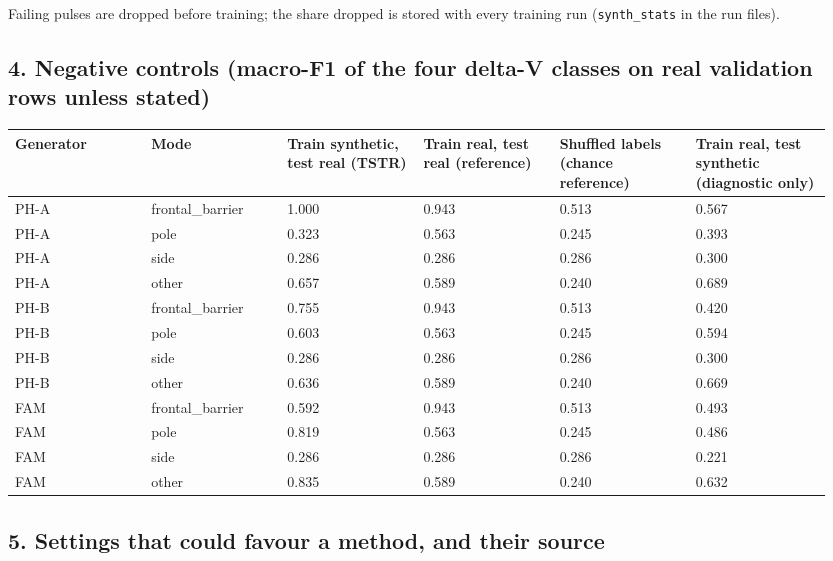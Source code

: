 Failing pulses are dropped before training; the share dropped is stored with every training run (\texttt{synth\_stats} in the run files).

\subsection*{4. Negative controls (macro-F1 of the four delta-V classes on real validation rows unless stated)}

{\scriptsize\raggedright
\begin{longtable}{p{0.158\linewidth}p{0.158\linewidth}p{0.158\linewidth}p{0.158\linewidth}p{0.158\linewidth}p{0.158\linewidth}}
\toprule
Generator & Mode & Train synthetic, test real (TSTR) & Train real, test real (reference) & Shuffled labels (chance reference) & Train real, test synthetic (diagnostic only) \\
\midrule
\endhead
PH-A & frontal\_barrier & 1.000 & 0.943 & 0.513 & 0.567 \\
PH-A & pole & 0.323 & 0.563 & 0.245 & 0.393 \\
PH-A & side & 0.286 & 0.286 & 0.286 & 0.300 \\
PH-A & other & 0.657 & 0.589 & 0.240 & 0.689 \\
PH-B & frontal\_barrier & 0.755 & 0.943 & 0.513 & 0.420 \\
PH-B & pole & 0.603 & 0.563 & 0.245 & 0.594 \\
PH-B & side & 0.286 & 0.286 & 0.286 & 0.300 \\
PH-B & other & 0.636 & 0.589 & 0.240 & 0.669 \\
FAM & frontal\_barrier & 0.592 & 0.943 & 0.513 & 0.493 \\
FAM & pole & 0.819 & 0.563 & 0.245 & 0.486 \\
FAM & side & 0.286 & 0.286 & 0.286 & 0.221 \\
FAM & other & 0.835 & 0.589 & 0.240 & 0.632 \\
\bottomrule
\end{longtable}}

\subsection*{5. Settings that could favour a method, and their source}

